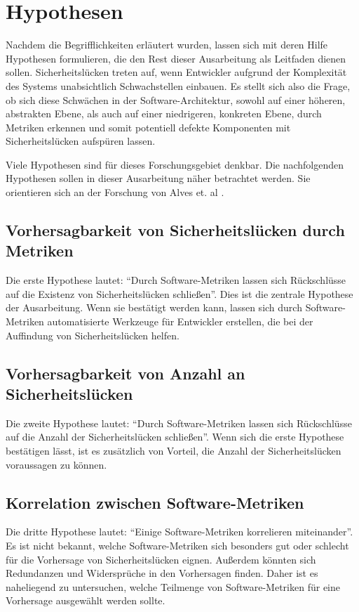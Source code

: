 \section{Hypothesen}
\label{sec:hypothesen}
Nachdem die Begrifflichkeiten erläutert wurden, lassen sich mit deren Hilfe Hypothesen formulieren, die den Rest dieser Ausarbeitung als Leitfaden dienen sollen.
Sicherheitslücken treten auf, wenn Entwickler aufgrund der Komplexität des Systems unabsichtlich Schwachstellen einbauen.
Es stellt sich also die Frage, ob sich diese Schwächen in der Software-Architektur,
sowohl auf einer höheren, abstrakten Ebene, als auch auf einer niedrigeren, konkreten Ebene,
durch Metriken erkennen und somit potentiell defekte Komponenten mit Sicherheitslücken aufspüren lassen.

Viele Hypothesen sind für dieses Forschungsgebiet denkbar.
Die nachfolgenden Hypothesen sollen in dieser Ausarbeitung näher betrachtet werden.
Sie orientieren sich an der Forschung von Alves et. al \cite{alves_et_al}.

\subsection{Vorhersagbarkeit von Sicherheitslücken durch Metriken}
Die erste Hypothese lautet: "`Durch Software-Metriken lassen sich Rückschlüsse auf die Existenz von Sicherheitslücken schließen"'.
Dies ist die zentrale Hypothese der Ausarbeitung.
Wenn sie bestätigt werden kann, lassen sich durch Software-Metriken automatisierte Werkzeuge für Entwickler erstellen, die bei der Auffindung von Sicherheitslücken helfen.

\subsection{Vorhersagbarkeit von Anzahl an Sicherheitslücken}
Die zweite Hypothese lautet: "`Durch Software-Metriken lassen sich Rückschlüsse auf die Anzahl der Sicherheitslücken schließen"'.
Wenn sich die erste Hypothese bestätigen lässt, ist es zusätzlich von Vorteil, die Anzahl der Sicherheitslücken voraussagen zu können.

\subsection{Korrelation zwischen Software-Metriken}
Die dritte Hypothese lautet: "`Einige Software-Metriken korrelieren miteinander"'.
Es ist nicht bekannt, welche Software-Metriken sich besonders gut oder schlecht für die Vorhersage von Sicherheitslücken eignen.
Außerdem könnten sich Redundanzen und Widersprüche in den Vorhersagen finden.
Daher ist es naheliegend zu untersuchen, welche Teilmenge von Software-Metriken für eine Vorhersage ausgewählt werden sollte.
